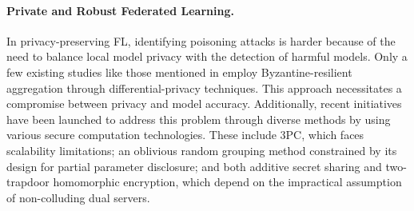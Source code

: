


\paragraph{Private and Robust Federated Learning.}

In privacy-preserving FL, identifying poisoning attacks is harder because of the need to balance local model privacy with the detection of harmful models.
Only a few existing studies like those mentioned in \cite{yang2023model,hossain2021desmp,jiang2020mitigating,huang2024vppfl} employ Byzantine-resilient aggregation through differential-privacy techniques. This approach necessitates a compromise between privacy and model accuracy.
Additionally, recent initiatives have been launched to address this problem through diverse methods by using various secure computation technologies. These include 3PC\cite{dong2023privacy}, which faces scalability limitations; an oblivious random grouping method constrained by its design for partial parameter disclosure\cite{zhang2023safelearning}; and both additive secret sharing\cite{li2024efficiently} and two-trapdoor homomorphic encryption\cite{ma2022shieldfl}, which depend on the impractical assumption of non-colluding dual servers.



